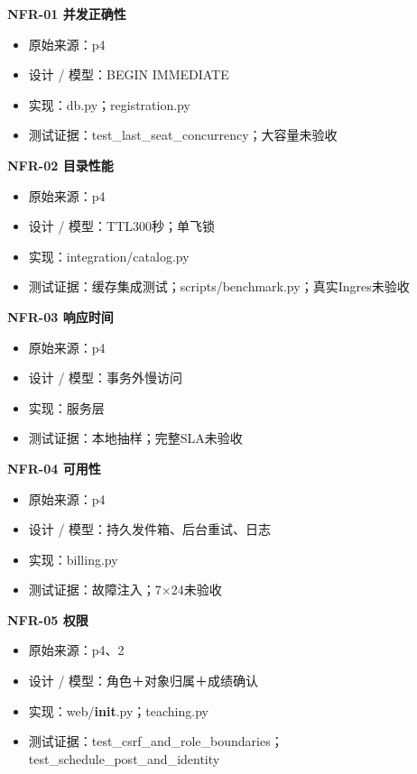 \documentclass[UTF8,11pt,a4paper]{ctexart}
\providecommand{\tightlist}{\setlength{\itemsep}{0pt}\setlength{\parskip}{0pt}}
\begin{document}
\textbf{NFR-01 并发正确性}

\begin{itemize}
\tightlist
\item
  原始来源：p4
\item
  设计 / 模型：BEGIN IMMEDIATE
\item
  实现：db.py；registration.py
\item
  测试证据：test\_\allowbreak{}last\_\allowbreak{}seat\_\allowbreak{}concurrency；大容量未验收
\end{itemize}

\textbf{NFR-02 目录性能}

\begin{itemize}
\tightlist
\item
  原始来源：p4
\item
  设计 / 模型：TTL300秒；单飞锁
\item
  实现：integration/catalog.py
\item
  测试证据：缓存集成测试；scripts/benchmark.py；真实Ingres未验收
\end{itemize}

\textbf{NFR-03 响应时间}

\begin{itemize}
\tightlist
\item
  原始来源：p4
\item
  设计 / 模型：事务外慢访问
\item
  实现：服务层
\item
  测试证据：本地抽样；完整SLA未验收
\end{itemize}

\textbf{NFR-04 可用性}

\begin{itemize}
\tightlist
\item
  原始来源：p4
\item
  设计 / 模型：持久发件箱、后台重试、日志
\item
  实现：billing.py
\item
  测试证据：故障注入；7×24未验收
\end{itemize}

\textbf{NFR-05 权限}

\begin{itemize}
\tightlist
\item
  原始来源：p4、2
\item
  设计 / 模型：角色＋对象归属＋成绩确认
\item
  实现：web/\textbf{init}.py；teaching.py
\item
  测试证据：test\_\allowbreak{}csrf\_\allowbreak{}and\_\allowbreak{}role\_\allowbreak{}boundaries；test\_\allowbreak{}schedule\_\allowbreak{}post\_\allowbreak{}and\_\allowbreak{}identity
\end{itemize}
\end{document}
